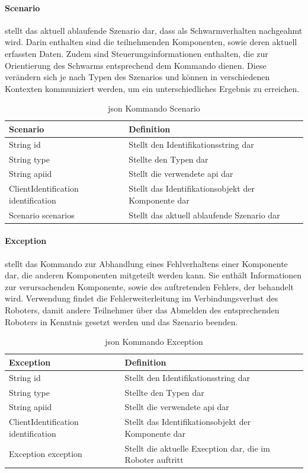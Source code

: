 \paragraph{Scenario} stellt das aktuell ablaufende Szenario dar, dass als Schwarmverhalten nachgeahmt wird. Darin enthalten sind die teilnehmenden Komponenten, sowie deren aktuell erfassten Daten. Zudem sind Steuerungsinformationen enthalten, die zur Orientierung des Schwarms entsprechend dem Kommando dienen. Diese verändern sich je nach Typen des Szenarios und können in verschiedenen Kontexten kommuniziert werden, um ein unterschiedliches Ergebnis zu erreichen.\\

\begin{table}[h]
	\centering
	\begin{tabular}{|p{4cm}|p{8cm}|}
		\hline
		\textbf{Scenario} & Definition\\
		\hline
		String id & Stellt den Identifikationsstring dar \\
		String type & Stellte den Typen dar \\
		String apiid & Stellt die verwendete \gls{api} dar \\
		ClientIdentification identification & Stellt das Identifikationsobjekt der Komponente dar \\
		Scenario scenarios & Stellt das aktuell ablaufende Szenario dar \\
		\hline
	\end{tabular}
	\caption[\gls{json} Kommando Scenario]{\gls{json} Kommando Scenario}
	\label{tab:Szenario}
\end{table}

\paragraph{Exception} stellt das Kommando zur Abhandlung eines Fehlverhaltens einer Komponente dar, die anderen Komponenten mitgeteilt werden kann. Sie enthält Informationen zur verursachenden Komponente, sowie des auftretenden Fehlers, der behandelt wird. Verwendung findet die Fehlerweiterleitung im Verbindungsverlust des Roboters, damit andere Teilnehmer über das Abmelden des entsprechenden Roboters in Kenntnis gesetzt werden und das Szenario beenden.

\begin{table}[h]
	\centering
	\begin{tabular}{|p{4cm}|p{8cm}|}
		\hline
		\textbf{Exception} & Definition\\
		\hline
		String id & Stellt den Identifikationsstring dar \\
		String type & Stellte den Typen dar \\
		String apiid & Stellt die verwendete \gls{api} dar \\
		ClientIdentification identification & Stellt das Identifikationsobjekt der Komponente dar \\
		Exception exception & Stellt die aktuelle Execption dar, die im Roboter auftritt \\
		\hline
	\end{tabular}
	\caption[\gls{json} Kommando Exception]{\gls{json} Kommando Exception}
	\label{tab:Exception}
\end{table}

